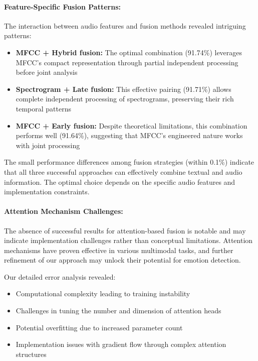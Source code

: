 \documentclass[12pt]{article}
\begin{document}
\paragraph{Feature-Specific Fusion Patterns:}
The interaction between audio features and fusion methods revealed intriguing patterns:

\begin{itemize}
    \item \textbf{MFCC + Hybrid fusion:} The optimal combination (91.74\%) leverages MFCC's compact representation through partial independent processing before joint analysis
    
    \item \textbf{Spectrogram + Late fusion:} This effective pairing (91.71\%) allows complete independent processing of spectrograms, preserving their rich temporal patterns
    
    \item \textbf{MFCC + Early fusion:} Despite theoretical limitations, this combination performs well (91.64\%), suggesting that MFCC's engineered nature works with joint processing
\end{itemize}

The small performance differences among fusion strategies (within 0.1\%) indicate that all three successful approaches can effectively combine textual and audio information. The optimal choice depends on the specific audio features and implementation constraints.

\paragraph{Attention Mechanism Challenges:}
The absence of successful results for attention-based fusion is notable and may indicate implementation challenges rather than conceptual limitations. Attention mechanisms have proven effective in various multimodal tasks, and further refinement of our approach may unlock their potential for emotion detection.

Our detailed error analysis revealed:

\begin{itemize}
    \item Computational complexity leading to training instability
    \item Challenges in tuning the number and dimension of attention heads
    \item Potential overfitting due to increased parameter count
    \item Implementation issues with gradient flow through complex attention structures
\end{itemize}
\end{document}
